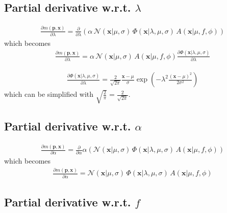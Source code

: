 \documentclass{article}
\begin{document}
\subsection{Partial derivative w.r.t. $\lambda$}
\begin{align}
\frac{\partial m\left(\mathbf{p},\mathbf{x}\right)}{\partial \lambda} = \frac{\partial}{\partial \lambda}\left(\alpha\,\mathcal{N}(\mathbf{x}|\mu,\sigma) \, \Phi(\mathbf{x}|\lambda,\mu,\sigma) \, A(\mathbf{x}|\mu,f,\phi)\right)
\end{align}
which becomes
\begin{align}
\frac{\partial m\left(\mathbf{p},\mathbf{x}\right)}{\partial \lambda} = \alpha\,\mathcal{N}(\mathbf{x}|\mu,\sigma) \, A(\mathbf{x}|\mu,f,\phi) \frac{\partial \Phi(\mathbf{x}|\lambda,\mu,\sigma)}{\partial \lambda}
\end{align}

\begin{align}
\frac{\partial\Phi(\mathbf{x}|\lambda,\mu,\sigma)}{\partial\lambda}=\frac{2}{\sqrt{2\pi}}\frac{\mathbf{x}-\mu}{\sigma}\exp\left(-\lambda^2\frac{(\mathbf{x}-\mu)^2}{2\sigma^2}\right)
\end{align}
which can be simplified with $\sqrt{\frac{2}{\pi}}=\frac{2}{\sqrt{2\pi}}$.

\subsection{Partial derivative w.r.t. $\alpha$}
\begin{align}
\frac{\partial m\left(\mathbf{p},\mathbf{x}\right)}{\partial \alpha} = \frac{\partial}{\partial \alpha}\alpha\left(\mathcal{N}(\mathbf{x}|\mu,\sigma) \, \Phi(\mathbf{x}|\lambda,\mu,\sigma)  \, A(\mathbf{x}|\mu,f,\phi)\right)
\end{align}
which becomes
\begin{align}
\frac{\partial m\left(\mathbf{p},\mathbf{x}\right)}{\partial \alpha} = \mathcal{N}(\mathbf{x}|\mu,\sigma) \, \Phi(\mathbf{x}|\lambda,\mu,\sigma) \, A(\mathbf{x}|\mu,f,\phi)
\end{align}

\subsection{Partial derivative w.r.t. $f$}
\end{document}
